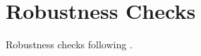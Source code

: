 \section{Robustness Checks}
\label{sec:app:robustness-checks}

Robustness checks following \cite{Abdellaoui2010a}.